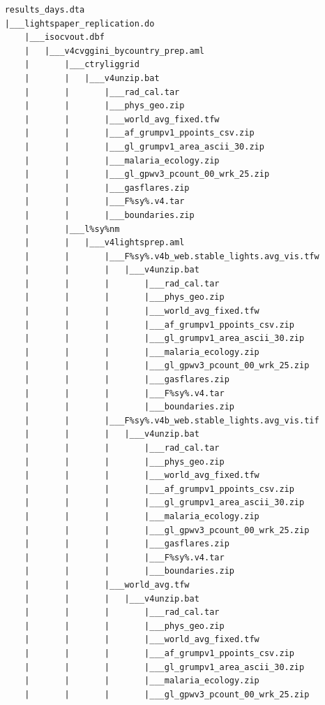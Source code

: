 \documentclass[]{book}
\begin{document}
\begin{verbatim}
    results_days.dta
    |___lightspaper_replication.do
        |___isocvout.dbf
        |   |___v4cvggini_bycountry_prep.aml
        |       |___ctryliggrid
        |       |   |___v4unzip.bat
        |       |       |___rad_cal.tar
        |       |       |___phys_geo.zip
        |       |       |___world_avg_fixed.tfw
        |       |       |___af_grumpv1_ppoints_csv.zip
        |       |       |___gl_grumpv1_area_ascii_30.zip
        |       |       |___malaria_ecology.zip
        |       |       |___gl_gpwv3_pcount_00_wrk_25.zip
        |       |       |___gasflares.zip
        |       |       |___F%sy%.v4.tar
        |       |       |___boundaries.zip
        |       |___l%sy%nm
        |       |   |___v4lightsprep.aml
        |       |       |___F%sy%.v4b_web.stable_lights.avg_vis.tfw
        |       |       |   |___v4unzip.bat
        |       |       |       |___rad_cal.tar
        |       |       |       |___phys_geo.zip
        |       |       |       |___world_avg_fixed.tfw
        |       |       |       |___af_grumpv1_ppoints_csv.zip
        |       |       |       |___gl_grumpv1_area_ascii_30.zip
        |       |       |       |___malaria_ecology.zip
        |       |       |       |___gl_gpwv3_pcount_00_wrk_25.zip
        |       |       |       |___gasflares.zip
        |       |       |       |___F%sy%.v4.tar
        |       |       |       |___boundaries.zip
        |       |       |___F%sy%.v4b_web.stable_lights.avg_vis.tif
        |       |       |   |___v4unzip.bat
        |       |       |       |___rad_cal.tar
        |       |       |       |___phys_geo.zip
        |       |       |       |___world_avg_fixed.tfw
        |       |       |       |___af_grumpv1_ppoints_csv.zip
        |       |       |       |___gl_grumpv1_area_ascii_30.zip
        |       |       |       |___malaria_ecology.zip
        |       |       |       |___gl_gpwv3_pcount_00_wrk_25.zip
        |       |       |       |___gasflares.zip
        |       |       |       |___F%sy%.v4.tar
        |       |       |       |___boundaries.zip
        |       |       |___world_avg.tfw
        |       |       |   |___v4unzip.bat
        |       |       |       |___rad_cal.tar
        |       |       |       |___phys_geo.zip
        |       |       |       |___world_avg_fixed.tfw
        |       |       |       |___af_grumpv1_ppoints_csv.zip
        |       |       |       |___gl_grumpv1_area_ascii_30.zip
        |       |       |       |___malaria_ecology.zip
        |       |       |       |___gl_gpwv3_pcount_00_wrk_25.zip

\end{verbatim}
\end{document}
